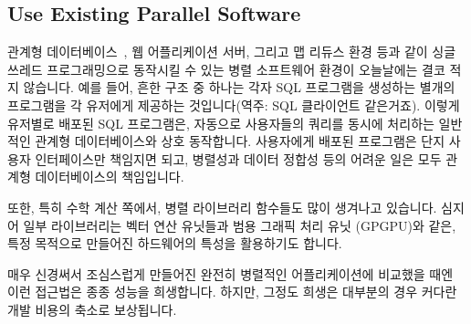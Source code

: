\subsection{Use Existing Parallel Software}
\label{sec:intro:Use Existing Parallel Software}

관계형 데이터베이스~\cite{Date82}, 웹 어플리케이션 서버, 그리고 맵 리듀스 환경
등과 같이 싱글 쓰레드 프로그래밍으로 동작시킬 수 있는 병렬 소프트웨어 환경이
오늘날에는 결코 적지 않습니다.
예를 들어, 흔한 구조 중 하나는 각자 SQL 프로그램을 생성하는 별개의 프로그램을
각 유저에게 제공하는 것입니다(역주: SQL 클라이언트 같은거죠).
이렇게 유저별로 배포된 SQL 프로그램은, 자동으로 사용자들의 쿼리를 동시에
처리하는 일반적인 관계형 데이터베이스와 상호 동작합니다.
사용자에게 배포된 프로그램은 단지 사용자 인터페이스만 책임지면 되고,
병렬성과 데이터 정합성 등의 어려운 일은 모두 관계형 데이터베이스의 책임입니다.


또한, 특히 수학 계산 쪽에서, 병렬 라이브러리 함수들도 많이 생겨나고 있습니다.
심지어 일부 라이브러리는 벡터 연산 유닛들과 범용 그래픽 처리 유닛 (GPGPU)와
같은, 특정 목적으로 만들어진 하드웨어의 특성을 활용하기도 합니다.


매우 신경써서 조심스럽게 만들어진 완전히 병렬적인 어플리케이션에 비교했을 때엔
이런 접근법은 종종 성능을 희생합니다.
하지만, 그정도 희생은 대부분의 경우 커다란 개발 비용의 축소로 보상됩니다.


